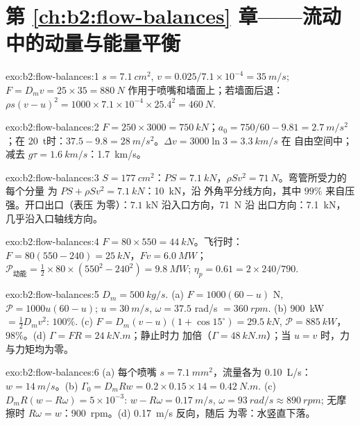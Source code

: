\section*{第 \ref{ch:b2:flow-balances} 章——流动中的动量与能量平衡}

\begin{solution}{exo:b2:flow-balances:1}
$s = \qty{7.1}{cm^2}$, $v = 0.025/7.1 \times 10^{-4} = \qty{35}{m/s}$; $F = D_mv = 25
\times 35 = \qty{880}{N}$ 作用于喷嘴和墙面上；若墙面后退：$\rho s(v -
u)^2 = 1000 \times 7.1 \times 10^{-4} \times 25.4^2 = \qty{460}{N}$.
\end{solution}

\begin{solution}{exo:b2:flow-balances:2}
$F = 250 \times 3000 = \qty{750}{kN}$；$a_0 = 750/60 - 9.81 = \qty{2.7}{m/s^2}$；在
\qty{20}{t}时：$37.5 - 9.8 = \qty{28}{m/s^2}$。$\Delta v = 3000\ln3 = \qty{3.3}{km/s}$ 在
自由空间中；减去 $g\tau = \qty{1.6}{km/s}$：\qty{1.7}{km/s}。
\end{solution}

\begin{solution}{exo:b2:flow-balances:3}
$S = \qty{177}{cm^2}$：$PS = \qty{7.1}{kN}$，$\rho Sv^2 = \qty{71}{N}$。弯管所受力的每个分量
为 $PS + \rho Sv^2 = \qty{7.1}{kN}$：\qty{10}{kN}，沿
外角平分线方向，其中 $99\%$ 来自压强。开口出口（表压
为零）：$7.1$ kN 沿入口方向，\qty{71}{N} 沿
出口方向：\qty{7.1}{kN}，几乎沿入口轴线方向。
\end{solution}

\begin{solution}{exo:b2:flow-balances:4}
$F = 80 \times 550 = \qty{44}{kN}$。飞行时：$F = 80(550 - 240) = \qty{25}{kN}$，$Fv =
\qty{6.0}{MW}$；$\mathcal P_{\text{动能}} = \tfrac12 \times 80 \times (550^2 - 240^2) =
\qty{9.8}{MW}$; $\eta_p = 0.61 = 2 \times 240/790$.
\end{solution}

\begin{solution}{exo:b2:flow-balances:5}
$D_m = \qty{500}{kg/s}$. (a) $F = 1000(60 - u)$ N, $\mathcal P = 1000u(60 - u)$; $u =
\qty{30}{m/s}$, $\omega = 37.5$ rad/s $= \qty{360}{rpm}$. (b) \qty{900}{kW} $=
\tfrac12D_mv^2$: $100\%$. (c) $F = D_m(v - u)(1 + \cos15^\circ) = \qty{29.5}{kN}$, $\mathcal P
= \qty{885}{kW}$，$98\%$。(d) $\Gamma = FR = \qty{24}{kN.m}$；静止时力
加倍（$\Gamma = \qty{48}{kN.m}$）；当 $u = v$ 时，力与力矩均为零。
\end{solution}

\begin{solution}{exo:b2:flow-balances:6}
(a) 每个喷嘴 $s = \qty{7.1}{mm^2}$，流量各为 \qty{0.10}{L/s}：$w = \qty{14}{m/s}$。(b)
$\Gamma_0 = D_mRw = 0.2 \times 0.15 \times 14 = \qty{0.42}{N.m}$. (c) $D_mR(w - R\omega) =
5 \times 10^{-3}$: $w - R\omega = \qty{0.17}{m/s}$, $\omega = \qty{93}{rad/s} \approx \qty{890}{rpm}$;
无摩擦时 $R\omega = w$：\qty{900}{rpm}。(d) \qty{0.17}{m/s} 反向，随后
为零：水竖直下落。
\end{solution}

